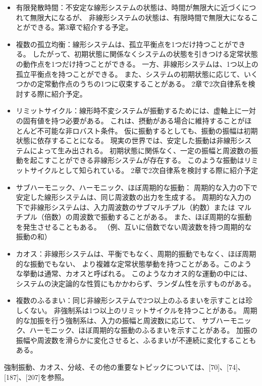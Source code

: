 \documentclass{jsarticle}
\begin{document}
    \begin{itemize}
        \item 有限発散時間：不安定な線形システムの状態は、時間が無限大に近づくにつれて無限大になるが、
        非線形システムの状態は、有限時間で無限大になることができる。第3章で紹介する予定。
        \item 複数の孤立均衡：線形システムは、孤立平衡点を1つだけ持つことができる。
        したがって、初期状態に関係なくシステムの状態を引きつける定常状態の動作点を1つだけ持つことができる。
        一方、非線形システムは、1つ以上の孤立平衡点を持つことができる。
        また、システムの初期状態に応じて、いくつかの定常動作点のうちの1つに収束することがある。
        2章で2次自律系を検討する際に紹介予定。
        \item リミットサイクル：線形時不変システムが振動するためには、虚軸上に一対の固有値を持つ必要がある。
        これは、摂動がある場合に維持することがほとんど不可能な非ロバスト条件。
        仮に振動するとしても、振動の振幅は初期状態に依存することになる。
        現実の世界では、安定した振動は非線形システムによって生み出される。
        初期状態に関係なく、一定の振幅と周波数の振動を起こすことができる非線形システムが存在する。
        このような振動はリミットサイクルとして知られている。
        2章で2次自律系を検討する際に紹介予定
        \item サブハーモニック、ハーモニック、ほぼ周期的な振動：
        周期的な入力の下で安定した線形システムは、同じ周波数の出力を生成する。
        周期的な入力の下で非線形システムは、入力周波数のサブマルチプル（約数）または
        マルチプル（倍数）の周波数で振動することがある。
        また、ほぼ周期的な振動を発生させることもある。
        （例、互いに倍数でない周波数を持つ周期的な振動の和）
        \item カオス：非線形システムは、平衡でもなく、周期的振動でもなく、ほぼ周期的な振動でもない、
        より複雑な定常状態挙動を持つことがある。このような挙動は通常、カオスと呼ばれる。
        このようなカオス的な運動の中には、システムの決定論的な性質にもかかわらず、ランダム性を示すものがある。 
        \item 複数のふるまい：同じ非線形システムで2つ以上のふるまいを示すことは珍しくない。
        非強制系は1つ以上のリミットサイクルを持つことがある。
        周期的な加振を行う強制系は、入力の振幅と周波数に応じて、
        サブハーモニック、ハーモニック、ほぼ周期的な振動のふるまいを示すことがある。
        加振の振幅や周波数を滑らかに変化させると、ふるまいが不連続に変化することもある。
\end{itemize}
強制振動、カオス、分岐、その他の重要なトピックについては、[70]、[74]、[187]、[207]を参照。
\end{document}
